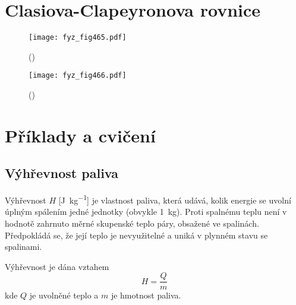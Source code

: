   
  \section{Clasiova-Clapeyronova rovnice}\label{fyz:IchapXLVsecIII}
  
    \begin{figure}[ht!] %
      \centering
      \texttt{[image: fyz\_fig465.pdf]}
      \caption{ 
              (\cite[s.~707]{Feynman01})}
      \label{fyz:fig465}
    \end{figure}

    \begin{figure}[ht!] %
      \centering
      \texttt{[image: fyz\_fig466.pdf]}
      \caption{ 
              (\cite[s.~707]{Feynman01})}
      \label{fyz:fig466}
    \end{figure}
  \section{Příklady a cvičení}\label{fyz:IchapXLVsecIV}
    \subsection{Výhřevnost paliva}\label{fyz:IchapXLVsecIVssecI}
      Výhřevnost \(H\) [\si{\joule\per\kg}] je vlastnost paliva, která udává, kolik energie se
      uvolní úplným spálením jedné jednotky (obvykle \SI{1}{\kg}). Proti spalnému teplu není v
      hodnotě zahrnuto měrné skupenské teplo páry, obsažené ve spalinách. Předpokládá se, že její
      teplo je nevyužitelné a uniká v plynném stavu se spalinami.

      Výhřevnost je dána vztahem
      \begin{equation*}
        H=\dfrac{Q}{m}
      \end{equation*}
      kde \(Q\) je uvolněné teplo a \(m\) je hmotnost paliva. 

      
      
      
      
    
